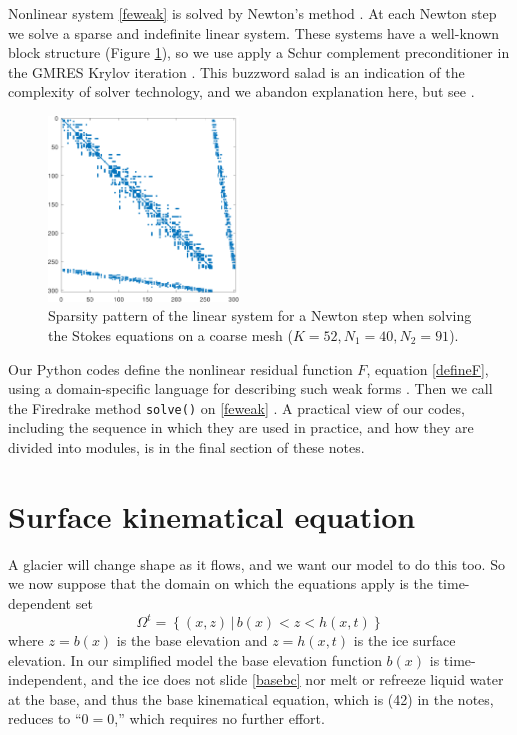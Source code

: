 \documentclass[letterpaper,final,12pt,reqno]{amsart}
\begin{document}
Nonlinear system \eqref{feweak} is solved by Newton's method \cite{BuelerBook,Kelley2003}.  At each Newton step we solve a sparse and indefinite linear system.  These systems have a well-known block structure (Figure \ref{fig:lowspy}), so we use apply a Schur complement preconditioner in the GMRES Krylov iteration \cite{Elmanetal2014,GolubVanLoan2013}.  This buzzword salad is an indication of the complexity of solver technology, and we abandon explanation here, but see \cite[Chapter 14]{BuelerBook}.

\begin{figure}[h]
\includegraphics[width=0.45\textwidth]{lowspy}
\caption{Sparsity pattern of the linear system for a Newton step when solving the Stokes equations on a coarse mesh ($K=52,N_1=40,N_2=91$).}
\label{fig:lowspy}
\end{figure}

Our Python codes define the nonlinear residual function $F$, equation \eqref{defineF}, using a domain-specific language for describing such weak forms \cite{Alnaesetal2014}.  Then we call the Firedrake method \texttt{solve()} on \eqref{feweak} \cite{Rathgeberetal2016}.  A practical view of our codes, including the sequence in which they are used in practice, and how they are divided into modules, is in the final section of these notes.


\section{Surface kinematical equation} \label{sec:kinematical}

A glacier will change shape as it flows, and we want our model to do this too.  So we now suppose that the domain on which the equations apply is the time-dependent set
\begin{equation}
\Omega^t = \left\{(x,z)\,\big|\, b(x) < z < h(x,t)\right\}  \label{Omegat}
\end{equation}
where $z=b(x)$ is the base elevation and $z=h(x,t)$ is the ice surface elevation.  In our simplified model the base elevation function $b(x)$ is time-independent, and the ice does not slide \eqref{basebc} nor melt or refreeze liquid water at the base, and thus the base kinematical equation, which is (42) in the notes, reduces to ``$0=0$,'' which requires no further effort.
\end{document}
